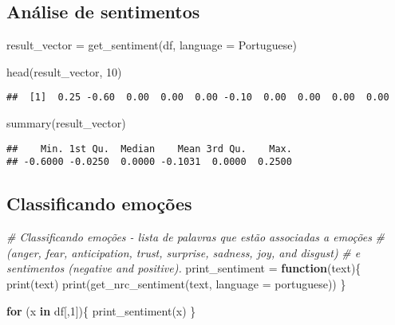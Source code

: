 \documentclass[
]{article}
\newenvironment{Shaded}{\begin{snugshade}}{\end{snugshade}}
\newcommand{\AttributeTok}[1]{\textcolor[rgb]{0.77,0.63,0.00}{#1}}
\newcommand{\CommentTok}[1]{\textcolor[rgb]{0.56,0.35,0.01}{\textit{#1}}}
\newcommand{\ControlFlowTok}[1]{\textcolor[rgb]{0.13,0.29,0.53}{\textbf{#1}}}
\newcommand{\DecValTok}[1]{\textcolor[rgb]{0.00,0.00,0.81}{#1}}
\newcommand{\FunctionTok}[1]{\textcolor[rgb]{0.00,0.00,0.00}{#1}}
\newcommand{\NormalTok}[1]{#1}
\newcommand{\OtherTok}[1]{\textcolor[rgb]{0.56,0.35,0.01}{#1}}
\newcommand{\StringTok}[1]{\textcolor[rgb]{0.31,0.60,0.02}{#1}}
\begin{document}
\hypertarget{anuxe1lise-de-sentimentos}{%
\subsection{Análise de sentimentos}\label{anuxe1lise-de-sentimentos}}

\begin{Shaded}
\begin{Highlighting}[]
\NormalTok{result\_vector }\OtherTok{=} \FunctionTok{get\_sentiment}\NormalTok{(df, }\AttributeTok{language =} \StringTok{\textquotesingle{}Portuguese\textquotesingle{}}\NormalTok{)}

\FunctionTok{head}\NormalTok{(result\_vector, }\DecValTok{10}\NormalTok{)}
\end{Highlighting}
\end{Shaded}

\begin{verbatim}
##  [1]  0.25 -0.60  0.00  0.00  0.00 -0.10  0.00  0.00  0.00  0.00
\end{verbatim}

\begin{Shaded}
\begin{Highlighting}[]
\FunctionTok{summary}\NormalTok{(result\_vector)}
\end{Highlighting}
\end{Shaded}

\begin{verbatim}
##    Min. 1st Qu.  Median    Mean 3rd Qu.    Max. 
## -0.6000 -0.0250  0.0000 -0.1031  0.0000  0.2500
\end{verbatim}

\hypertarget{classificando-emouxe7uxf5es}{%
\subsection{Classificando emoções}\label{classificando-emouxe7uxf5es}}

\begin{Shaded}
\begin{Highlighting}[]
\CommentTok{\# Classificando emoções {-} lista de palavras que estão associadas a emoções}
\CommentTok{\# (anger, fear, anticipation, trust, surprise, sadness, joy, and disgust)}
\CommentTok{\# e sentimentos  (negative and positive).}
\NormalTok{print\_sentiment }\OtherTok{=} \ControlFlowTok{function}\NormalTok{(text)\{}
  \FunctionTok{print}\NormalTok{(text)}
  \FunctionTok{print}\NormalTok{(}\FunctionTok{get\_nrc\_sentiment}\NormalTok{(text, }\AttributeTok{language =} \StringTok{\textquotesingle{}portuguese\textquotesingle{}}\NormalTok{))}
\NormalTok{\}}

\ControlFlowTok{for}\NormalTok{ (x }\ControlFlowTok{in}\NormalTok{ df[,}\DecValTok{1}\NormalTok{])\{}
  \FunctionTok{print\_sentiment}\NormalTok{(x)}
\NormalTok{\}}
\end{Highlighting}
\end{Shaded}
\end{document}
